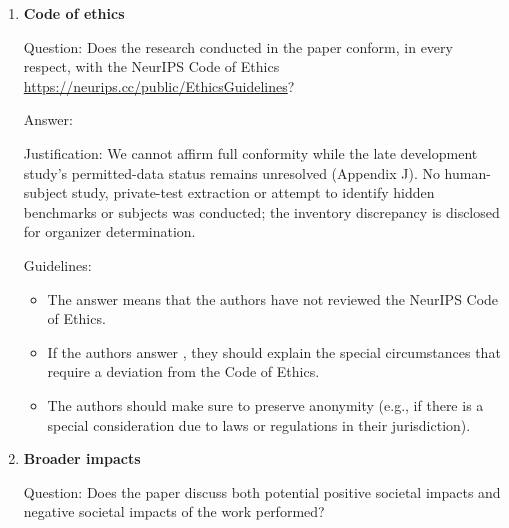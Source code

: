 \documentclass[
]{article}
\begin{document}
\begin{enumerate}
  Guidelines:

  \begin{itemize}
  \item
    The answer \answerNA{} means that the paper does not include
    experiments.
  \item
    The paper should indicate the type of compute workers CPU or GPU,
    internal cluster, or cloud provider, including relevant memory and
    storage.
  \item
    The paper should provide the amount of compute required for each of
    the individual experimental runs as well as estimate the total
    compute.
  \item
    The paper should disclose whether the full research project required
    more compute than the experiments reported in the paper (e.g.,
    preliminary or failed experiments that didn't make it into the
    paper).
  \end{itemize}
\item
  \textbf{Code of ethics}

  Question: Does the research conducted in the paper conform, in every
  respect, with the NeurIPS Code of Ethics
  \url{https://neurips.cc/public/EthicsGuidelines}?

  Answer: \answerNo{}

  Justification: We cannot affirm full conformity while the late
  development study's permitted-data status remains unresolved (Appendix
  J). No human-subject study, private-test extraction or attempt to
  identify hidden benchmarks or subjects was conducted; the inventory
  discrepancy is disclosed for organizer determination.

  Guidelines:

  \begin{itemize}
  \item
    The answer \answerNA{} means that the authors have not reviewed the
    NeurIPS Code of Ethics.
  \item
    If the authors answer \answerNo, they should explain the special
    circumstances that require a deviation from the Code of Ethics.
  \item
    The authors should make sure to preserve anonymity (e.g., if there
    is a special consideration due to laws or regulations in their
    jurisdiction).
  \end{itemize}
\item
  \textbf{Broader impacts}

  Question: Does the paper discuss both potential positive societal
  impacts and negative societal impacts of the work performed?


\end{enumerate}
\end{document}

